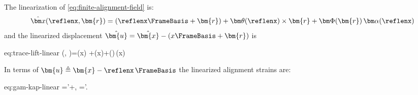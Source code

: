 \begin{remark}
The linearization of \eqref{eq:finite-alignment-field} is:
%
\begin{equation}
\hat{\bm x}(\reflenx, \bm{r})=(\reflenx\FrameBasis+\bm{r})+\bm\theta(\reflenx)\times\bm{r}+\bm\Phi(\bm{r})\,\bm\alpha(\reflenx)
\label{eq:linear-alignment-field}
\end{equation}
and the linearized displacement \(\hat{\bm{u}} = \hat{\bm{x}} - (x\FrameBasis + \bm{r})\) is
\begin{SaveEquation}{eq:trace-lift-linear}
(, )=(x)
+\bm\theta(x)\times{}+\bm\Phi()\,\bm{\alpha}(x)
\end{SaveEquation}
In terms of \(\bm{u}\triangleq\bm{x}- \reflenx\,\FrameBasis\) the linearized alignment strains are:
\begin{SaveEquation}{eq:gam-kap-linear}
\bm{\gamma}='+\FrameBasis\times\bm\theta,\qquad
\bm{\kappa}=\bm\theta'.
\end{SaveEquation}
\end{remark}




